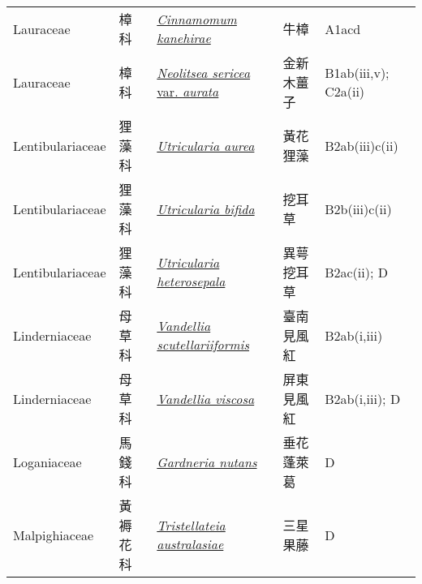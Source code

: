 {\begin{longtable}{L{2.5cm}L{2cm}L{5cm}L{2.5cm}L{3cm}}
    Lauraceae & 樟科 & \href{http://www.theplantlist.org/tpl1.1/search?q=Cinnamomum+kanehirae}{\textit{Cinnamomum kanehirae} } & 牛樟 & A1acd    \\
    Lauraceae & 樟科 & \href{http://www.theplantlist.org/tpl1.1/search?q=Neolitsea+sericea+var.+aurata}{\textit{Neolitsea sericea} var. \textit{aurata} } & 金新木薑子 & B1ab(iii,v); C2a(ii)    \\
    Lentibulariaceae & 狸藻科 & \href{http://www.theplantlist.org/tpl1.1/search?q=Utricularia+aurea}{\textit{Utricularia aurea} } & 黃花狸藻 & B2ab(iii)c(ii)    \\
    Lentibulariaceae & 狸藻科 & \href{http://www.theplantlist.org/tpl1.1/search?q=Utricularia+bifida}{\textit{Utricularia bifida} } & 挖耳草 & B2b(iii)c(ii)    \\
    Lentibulariaceae & 狸藻科 & \href{http://www.theplantlist.org/tpl1.1/search?q=Utricularia+heterosepala}{\textit{Utricularia heterosepala} } & 異萼挖耳草 & B2ac(ii); D    \\
    Linderniaceae & 母草科 & \href{http://www.theplantlist.org/tpl1.1/search?q=Vandellia+scutellariiformis}{\textit{Vandellia scutellariiformis} } & 臺南見風紅 & B2ab(i,iii)    \\
    Linderniaceae & 母草科 & \href{http://www.theplantlist.org/tpl1.1/search?q=Vandellia+viscosa}{\textit{Vandellia viscosa} } & 屏東見風紅 & B2ab(i,iii); D    \\
    Loganiaceae & 馬錢科 & \href{http://www.theplantlist.org/tpl1.1/search?q=Gardneria+nutans}{\textit{Gardneria nutans} } & 垂花蓬萊葛 & D    \\
    Malpighiaceae & 黃褥花科 & \href{http://www.theplantlist.org/tpl1.1/search?q=Tristellateia+australasiae}{\textit{Tristellateia australasiae} } & 三星果藤 & D    \\

\end{longtable}}
